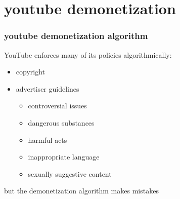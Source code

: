 \documentclass[presentation]{subfiles}
\begin{document}
\section{youtube demonetization}

\begin{frame}\frametitle{youtube demonetization algorithm}
    YouTube enforces many of its policies algorithmically:

    \begin{itemize}
      \item<+> copyright
      \item<+-> advertiser guidelines
      \begin{itemize}
        \item<3-> controversial issues
        \item<3-> dangerous substances
        \item<3-> harmful acts
        \item<3-> inappropriate language
        \item<3-> sexually suggestive content
      \end{itemize}
    \end{itemize}
\end{frame}

\begin{frame}[standout]
but the demonetization algorithm makes mistakes
\end{frame}
\end{document}
